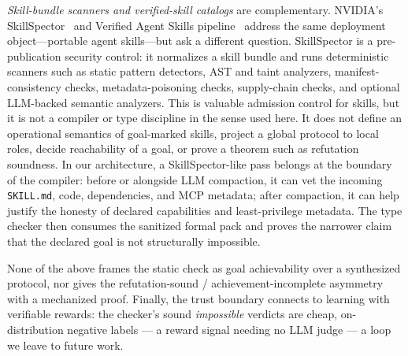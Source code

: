 \documentclass[11pt]{article}
\theoremstyle{plain}
\theoremstyle{definition}
\newcommand{\id}[1]{\texttt{#1}}
\begin{document}
\emph{Skill-bundle scanners and verified-skill catalogs} are complementary.
NVIDIA's SkillSpector~\cite{skillspector} and Verified Agent Skills
pipeline~\cite{verifiedskills} address the same deployment object---portable
agent skills---but ask a different question. SkillSpector is a pre-publication
security control: it normalizes a skill bundle and runs deterministic scanners
such as static pattern detectors, AST and taint analyzers, manifest-consistency
checks, metadata-poisoning checks, supply-chain checks, and optional LLM-backed
semantic analyzers. This is valuable admission control for skills, but it is not
a compiler or type discipline in the sense used here. It does not define an
operational semantics of goal-marked skills, project a global protocol to local
roles, decide reachability of a goal, or prove a theorem such as refutation
soundness. In our architecture, a SkillSpector-like pass belongs at the boundary
of the compiler: before or alongside LLM compaction, it can vet the incoming
\id{SKILL.md}, code, dependencies, and MCP metadata; after compaction, it can
help justify the honesty of declared capabilities and least-privilege metadata.
The type checker then consumes the sanitized formal pack and proves the narrower
claim that the declared goal is not structurally impossible.

None of the above frames the static check as goal achievability over a synthesized
protocol, nor gives the refutation-sound / achievement-incomplete asymmetry with a
mechanized proof. Finally, the trust boundary connects to learning with verifiable
rewards: the checker's sound \emph{impossible} verdicts are cheap, on-distribution
negative labels --- a reward signal needing no LLM judge --- a loop we leave to
future work.
\end{document}
